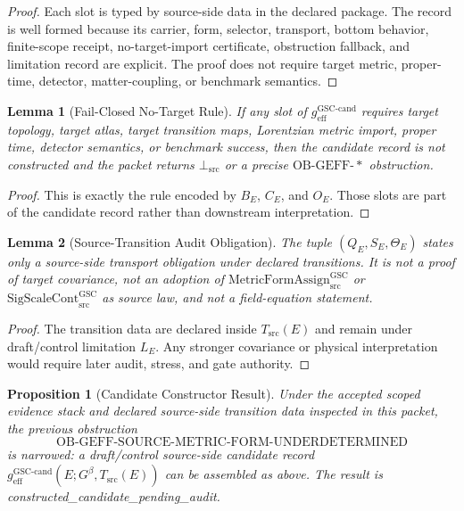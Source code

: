 \documentclass[11pt]{article}
\newtheorem{lemma}{Lemma}
\newtheorem{proposition}{Proposition}
\newcommand{\Gbeta}{G^{\beta}}
\newcommand{\SigScaleCont}{\mathrm{SigScaleCont}^{\mathrm{GSC}}_{\mathrm{src}}}
\newcommand{\MetricFormAssign}{\mathrm{MetricFormAssign}^{\mathrm{GSC}}_{\mathrm{src}}}
\newcommand{\Tsrc}{T_{\mathrm{src}}}
\newcommand{\BottomSrc}{\bot_{\mathrm{src}}}
\newcommand{\geffCand}{g_{\mathrm{eff}}^{\mathrm{GSC\mbox{-}cand}}}
\newcommand{\OBGEFF}{\mathrm{OB\mbox{-}GEFF}}
\begin{document}
\begin{proof}
Each slot is typed by source-side data in the declared package. The record is
well formed because its carrier, form, selector, transport, bottom behavior,
finite-scope receipt, no-target-import certificate, obstruction fallback, and
limitation record are explicit. The proof does not require target metric,
proper-time, detector, matter-coupling, or benchmark semantics.
\end{proof}

\begin{lemma}[Fail-Closed No-Target Rule]
If any slot of \(\geffCand\) requires target topology, target atlas, target
transition maps, Lorentzian metric import, proper time, detector semantics, or
benchmark success, then the candidate record is not constructed and the packet
returns \(\BottomSrc\) or a precise \(\OBGEFF\mbox{-}*\) obstruction.
\end{lemma}

\begin{proof}
This is exactly the rule encoded by \(B_E\), \(C_E\), and \(O_E\). Those slots
are part of the candidate record rather than downstream interpretation.
\end{proof}

\begin{lemma}[Source-Transition Audit Obligation]
The tuple \((Q_E,S_E,\Theta_E)\) states only a source-side transport obligation
under declared transitions. It is not a proof of target covariance, not an
adoption of \(\MetricFormAssign\) or \(\SigScaleCont\) as source law, and not a
field-equation statement.
\end{lemma}

\begin{proof}
The transition data are declared inside \(\Tsrc(E)\) and remain under
draft/control limitation \(L_E\). Any stronger covariance or physical
interpretation would require later audit, stress, and gate authority.
\end{proof}

\begin{proposition}[Candidate Constructor Result]
Under the accepted scoped evidence stack and declared source-side transition
data inspected in this packet, the previous obstruction
\[
\OBGEFF\mbox{-}\mathrm{SOURCE\mbox{-}METRIC\mbox{-}FORM\mbox{-}UNDERDETERMINED}
\]
is narrowed: a draft/control source-side candidate record
\(\geffCand(E;\Gbeta,\Tsrc(E))\) can be assembled as above. The result is
\emph{constructed\_candidate\_pending\_audit}.
\end{proposition}
\end{document}

